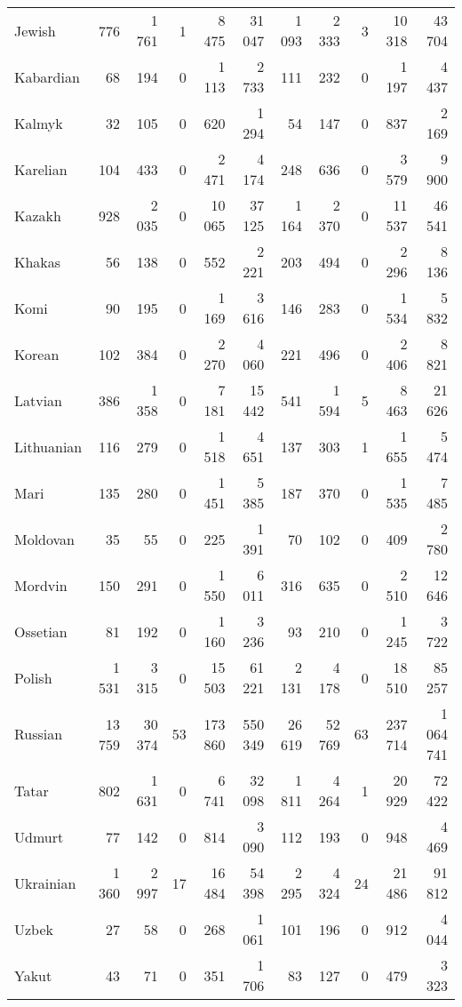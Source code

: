 \begin{table}[!h]
\begin{tabular}{lrrrrrrrrrr}
Jewish & 776 & 1 761 & 1 & 8 475 & 31 047 & 1 093 & 2 333 & 3 & 10 318 & 43 704\\
Kabardian & 68 & 194 & 0 & 1 113 & 2 733 & 111 & 232 & 0 & 1 197 & 4 437\\
Kalmyk & 32 & 105 & 0 & 620 & 1 294 & 54 & 147 & 0 & 837 & 2 169\\
Karelian & 104 & 433 & 0 & 2 471 & 4 174 & 248 & 636 & 0 & 3 579 & 9 900\\
Kazakh & 928 & 2 035 & 0 & 10 065 & 37 125 & 1 164 & 2 370 & 0 & 11 537 & 46 541\\
Khakas & 56 & 138 & 0 & 552 & 2 221 & 203 & 494 & 0 & 2 296 & 8 136\\
Komi & 90 & 195 & 0 & 1 169 & 3 616 & 146 & 283 & 0 & 1 534 & 5 832\\
Korean & 102 & 384 & 0 & 2 270 & 4 060 & 221 & 496 & 0 & 2 406 & 8 821\\
Latvian & 386 & 1 358 & 0 & 7 181 & 15 442 & 541 & 1 594 & 5 & 8 463 & 21 626\\
Lithuanian & 116 & 279 & 0 & 1 518 & 4 651 & 137 & 303 & 1 & 1 655 & 5 474\\
Mari & 135 & 280 & 0 & 1 451 & 5 385 & 187 & 370 & 0 & 1 535 & 7 485\\
Moldovan & 35 & 55 & 0 & 225 & 1 391 & 70 & 102 & 0 & 409 & 2 780\\
Mordvin & 150 & 291 & 0 & 1 550 & 6 011 & 316 & 635 & 0 & 2 510 & 12 646\\
Ossetian & 81 & 192 & 0 & 1 160 & 3 236 & 93 & 210 & 0 & 1 245 & 3 722\\
Polish & 1 531 & 3 315 & 0 & 15 503 & 61 221 & 2 131 & 4 178 & 0 & 18 510 & 85 257\\
Russian & 13 759 & 30 374 & 53 & 173 860 & 550 349 & 26 619 & 52 769 & 63 & 237 714 & 1 064 741\\
Tatar & 802 & 1 631 & 0 & 6 741 & 32 098 & 1 811 & 4 264 & 1 & 20 929 & 72 422\\
Udmurt & 77 & 142 & 0 & 814 & 3 090 & 112 & 193 & 0 & 948 & 4 469\\
Ukrainian & 1 360 & 2 997 & 17 & 16 484 & 54 398 & 2 295 & 4 324 & 24 & 21 486 & 91 812\\
Uzbek & 27 & 58 & 0 & 268 & 1 061 & 101 & 196 & 0 & 912 & 4 044\\
Yakut & 43 & 71 & 0 & 351 & 1 706 & 83 & 127 & 0 & 479 & 3 323\\
\bottomrule
\end{tabular}
\end{table}